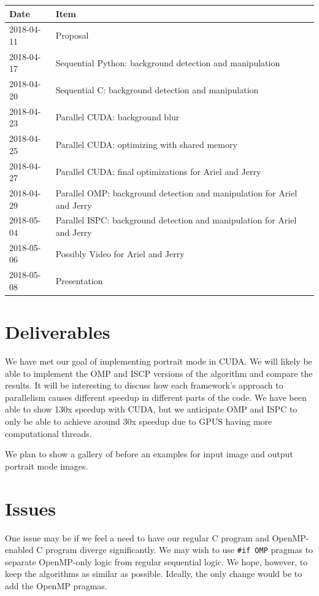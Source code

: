 \documentclass[12pt]{article}
\begin{document}
\begin{tabular}{l|l}
    Date & Item \\
    \hline
    2018-04-11 & Proposal \\
    2018-04-17 & Sequential Python: background detection and manipulation \\
    2018-04-20 & Sequential C: background detection and manipulation \\
    2018-04-23 & Parallel CUDA: background blur\\
    2018-04-25 & Parallel CUDA: optimizing with shared memory\\
    2018-04-27 & Parallel CUDA: final optimizations for Ariel and Jerry\\
    2018-04-29 & Parallel OMP: background detection and manipulation
                 for Ariel and Jerry\\
    2018-05-04 & Parallel ISPC: background detection and manipulation
                 for Ariel and Jerry\\
    2018-05-06 & Possibly Video for Ariel and Jerry\\
    2018-05-08 & Presentation
\end{tabular}

\section{Deliverables}

We have met our goal of implementing portrait mode in CUDA. We will likely be
able to implement the OMP and ISCP versions of the algorithm and compare the
results. It will be interesting to discuss how each framework's approach to
parallelism causes different speedup in different parts of the code. We have
been able to show 130x speedup with CUDA, but we anticipate OMP and ISPC to
only be able to achieve around 30x speedup due to GPUS having more
computational threads.

We plan to show a gallery of before an examples for input image and output
portrait mode images.

\section{Issues}

One issue may be if we feel a need to have our regular C program and OpenMP-
enabled C program diverge significantly. We may wish to use \texttt{#if OMP}
pragmas to separate OpenMP-only logic from regular sequential logic. We hope,
however, to keep the algorithms as similar as possible. Ideally, the only
change would be to add the OpenMP pragmas.
\end{document}
